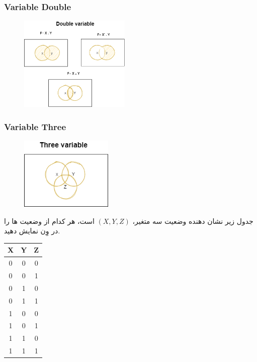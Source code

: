 \documentclass[20pt, a4paper]{article}
\begin{document}
\subsubsection{Variable Double}

\begin{figure}[htbp]
	\centerline{\includegraphics[width=150pt]{img/venn/venn-double Variable.png}}
\end{figure}
\newpage
\subsubsection{Variable Three}

\begin{figure}[htbp]
	\centerline{\includegraphics[width=125pt]{img/venn/venn-three_variable.png}}
\end{figure}
جدول زیر نشان دهنده وضعیت سه متغیر، $(X, Y, Z)$ است، هر کدام از وضعیت ها را در وِن نمایش دهید.

\center 
\begin{LTR}
	\begin{tabular}{ c c c }
		X & Y & Z \\
		\hline
		0 & 0 & 0 \\ 				
		0 & 0 & 1 \\
		0 & 1 & 0 \\
		0 & 1 & 1 \\
		1 & 0 & 0 \\
		1 & 0 & 1 \\
		1 & 1 & 0 \\
		1 & 1 & 1 \\	
	\end{tabular}
\end{LTR}
\end{document}
